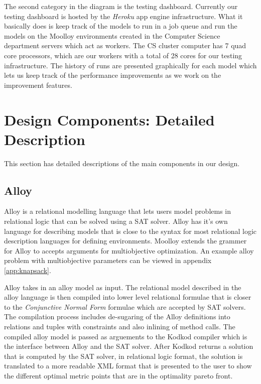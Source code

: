 \documentclass[11pt]{article}
\theoremstyle{definition}
\begin{document}
The second category in the diagram is the testing dashboard. Currently our testing dashboard is hosted by the \emph{Heroku} \cite{ref:heroku} app engine infrastructure. What it basically does is keep track of the models to run in a job queue and run the models on the Moolloy environments created in the Computer Science department servers which act as workers. The CS cluster computer has 7 quad core processors, which are our workers with a total of 28 cores for our testing infrastructure. The history of runs are presented graphically for each model which lets us keep track of the performance improvements as we work on the improvement features.

\section{Design Components: Detailed Description}\label{sec:components}
This section has detailed descriptions of the main components in our design.
\subsection{Alloy}\label{sec:alloy}
Alloy \cite{ref:alloy} is a relational modelling language that lets users model problems in relational logic that can be solved using a SAT solver. Alloy has it's own language for describing models that is close to the syntax for most relational logic description languages for defining environments. Moolloy extends the grammer for Alloy to accepts arguments for multiobjective optimization. An example alloy problem with multiobjective parameters can be viewed in appendix \ref{app:knapsack}.

Alloy takes in an alloy model as input. The relational model described in the alloy language is then compiled into lower level relational formulae that is closer to the \emph{Conjunctive Normal Form} formulae which are accepted by SAT solvers. The compilation process includes de-sugaring of the Alloy definitions into relations and tuples with constraints and also inlining of method calls. The compiled alloy model is passed as arguements to the Kodkod compiler which is the interface between Alloy and the SAT solver. After Kodkod returns a solution that is computed by the SAT solver, in relational logic format, the solution is translated to a more readable XML format that is presented to the user to show the different optimal metric points that are in the optimality pareto front.
\end{document}
